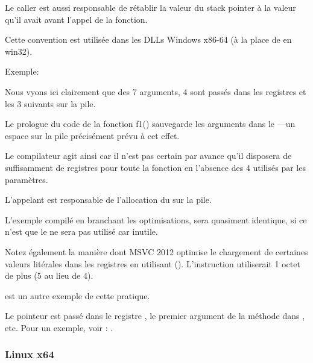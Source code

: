 Le \gls{caller} est aussi responsable de rétablir la valeur du \gls{stack pointer} à la valeur qu'il 
avait avant l'appel de la fonction.

Cette convention est utilisée dans les DLLs Windows x86-64 (à la place de  en win32).

Exemple:






Nous vyons ici clairement que des 7 arguments, 4 sont passés dans les registres et les 3 suivants sur 
la pile.

Le prologue du code de la fonction f1() sauvegarde les arguments dans le ---un espace 
sur la pile précisément prévu à cet effet.

Le compilateur agit ainsi car il n'est pas certain par avance qu'il disposera de suffisamment de
registres pour toute la fonction en l'absence des 4 utilisés par les paramètres.

L'appelant est responsable de l'allocation du  sur la pile.



L'exemple compilé en branchant les optimisations, sera quasiment identique, si ce n'est que le 
 ne sera pas utilisé car inutile.

\label{using_MOV_and_pack_of_LEA_to_load_values}

Notez également la manière dont MSVC 2012 optimise le chargement de certaines valeurs litérales dans 
les registres en utilisant \LEA ().
L'instruction  utiliserait 1 octet de plus (5 au lieu de 4).

 est un autre exemple de cette pratique.


Le pointeur \ITthis est passé dans le registre \RCX, le premier argument de la méthode dans \RDX, etc.
Pour un exemple, voir : .
 
\subsubsection{Linux x64}

